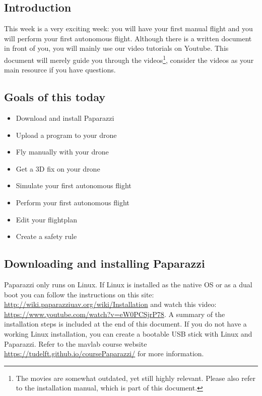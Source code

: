 \documentclass{article}
\begin{document}

\subsection*{Introduction}
This week is a very exciting week: you will have your first manual flight and you will perform your first autonomous flight. Although there is a written document in front of you, you will mainly use our video tutorials on Youtube. This document will merely guide you through the videos\footnote{The movies are somewhat outdated, yet still highly relevant. Please also refer to the installation manual, which is part of this document.}, consider the videos as your main resource if you have questions. 

\subsection*{Goals of this today}
\begin{itemize}
\item Download and install Paparazzi
\item Upload a program to your drone
\item Fly manually with your drone
\item Get a 3D fix on your drone
\item Simulate your first autonomous flight
\item Perform your first autonomous flight
\item Edit your flightplan
\item Create a safety rule
\end{itemize}

\subsection*{Downloading and installing Paparazzi}
Paparazzi only runs on Linux. If Linux is installed as the native OS or as a dual boot you can follow the instructions on this site: \url{http://wiki.paparazziuav.org/wiki/Installation} and watch this video: \url{https://www.youtube.com/watch?v=eW0PCSjrP78}. A summary of the installation steps is included at the end of this document.
If you do not have a working Linux installation, you can create a bootable USB stick with Linux and Paparazzi. Refer to the mavlab course website \url{https://tudelft.github.io/coursePaparazzi/} for more information.
\end{document}
